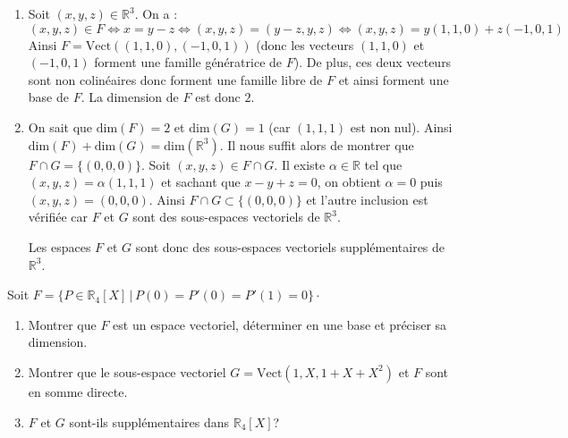 \documentclass[a4paper,10pt]{report}
\begin{document}
\corr \begin{enumerate}
\item Soit $(x,y,z) \in \mathbb{R}^3$. On a :
$$ (x,y,z) \in F \Longleftrightarrow x=y-z \Longleftrightarrow (x,y,z) = (y-z,y,z) \Longleftrightarrow (x,y,z) = y(1,1,0) + z(-1,0,1)$$
Ainsi $F = \textrm{Vect}((1,1,0), (-1,0,1))$ (donc les vecteurs $(1,1,0)$ et $(-1,0,1)$ forment une famille génératrice de $F$). De plus, ces deux vecteurs sont non colinéaires donc forment une famille libre de $F$ et ainsi forment une base de $F$. La dimension de $F$ est donc $2$.
\item On sait que $\textrm{dim}(F)=2$ et $\textrm{dim}(G)=1$ (car $(1,1,1)$ est non nul). Ainsi $\textrm{dim}(F) + \textrm{dim}(G) = \textrm{dim}(\mathbb{R}^3)$. Il nous suffit alors de montrer que $F \cap G = \lbrace (0,0,0) \rbrace$. Soit $(x,y,z) \in F \cap G$. Il existe $\alpha \in \mathbb{R}$ tel que $(x,y,z) = \alpha (1,1,1)$ et sachant que $x-y+z=0$, on obtient $\alpha = 0$ puis $(x,y,z)=(0,0,0)$. Ainsi $F \cap G \subset \lbrace (0,0,0) \rbrace$ et l'autre inclusion est vérifiée car $F$ et $G$ sont des sous-espaces vectoriels de $\mathbb{R}^3$.

\medskip

\noindent Les espaces $F$ et $G$ sont donc des sous-espaces vectoriels supplémentaires de $\mathbb{R}^3$.
\end{enumerate}

\medskip


\begin{Exa} Soit $F = \lbrace P \in \mathbb{R}_4[X] \, \vert \, P(0)=P'(0)=P'(1)=0 \rbrace \cdot$

\begin{enumerate}
\item Montrer que $F$ est un espace vectoriel, déterminer en une base et préciser sa dimension.
\item Montrer que le sous-espace vectoriel $G= \textrm{Vect}(1,X,1+X+X^2)$ et $F$  sont en somme directe.
\item $F$ et $G$ sont-ils supplémentaires dans $\mathbb{R}_4[X]$?
\end{enumerate}
\end{Exa}

\corr 
\end{document}
